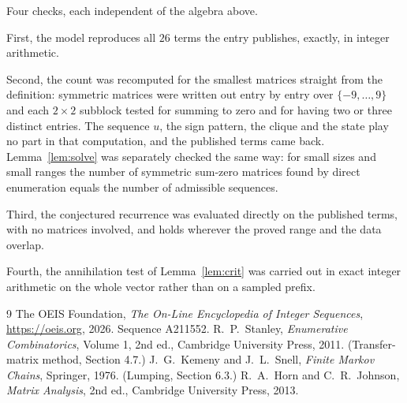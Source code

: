 \documentclass[11pt,a4paper]{article}
\theoremstyle{plain}
\theoremstyle{definition}
\begin{document}
Four checks, each independent of the algebra above.

First, the model reproduces all $26$ terms the entry publishes, exactly, in integer
arithmetic.

Second, the count was recomputed for the smallest matrices straight from the definition:
symmetric matrices were written out entry by entry over $\{-9,\dots,9\}$ and each
$2\times2$ subblock tested for summing to zero and for having two or three distinct entries. The
sequence $u$, the sign pattern, the clique and the state play no part in that computation, and
the published terms came back. Lemma~\ref{lem:solve} was separately checked the same way: for
small sizes and small ranges the number of symmetric sum-zero matrices found by direct
enumeration equals the number of admissible sequences.

Third, the conjectured recurrence was evaluated directly on the published terms, with no
matrices involved, and holds wherever the proved range and the data overlap.

Fourth, the annihilation test of Lemma~\ref{lem:crit} was carried out in exact integer
arithmetic on the whole vector rather than on a sampled prefix.

\begin{thebibliography}{9}
 The OEIS Foundation, \emph{The On-Line Encyclopedia of Integer
Sequences}, \url{https://oeis.org}, 2026. Sequence A211552.
 R.~P.~Stanley, \emph{Enumerative Combinatorics}, Volume 1, 2nd ed.,
Cambridge University Press, 2011. (Transfer-matrix method, Section 4.7.)
 J.~G.~Kemeny and J.~L.~Snell, \emph{Finite Markov Chains}, Springer, 1976.
(Lumping, Section 6.3.)
 R.~A.~Horn and C.~R.~Johnson, \emph{Matrix Analysis}, 2nd ed., Cambridge
University Press, 2013.
\end{thebibliography}
\end{document}
